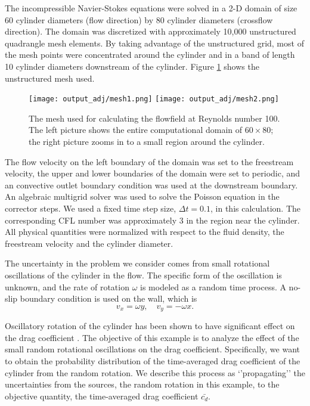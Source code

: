 The incompressible Navier-Stokes equations were solved in a
2-D domain of size 60 cylinder diameters (flow direction) by 80
cylinder diameters (crossflow direction).  The domain was discretized with
approximately 10,000 unstructured quadrangle mesh elements.
By taking advantage of
the unstructured grid, most of the mesh points were concentrated
around the cylinder
and in a band of length 10 cylinder diameters downstream of the cylinder.
Figure \ref{mesh1} shows the unstructured mesh used.
\begin{figure}[htb!] \center 
\texttt{[image: output\_adj/mesh1.png]}
\texttt{[image: output\_adj/mesh2.png]}
\caption{The mesh used for calculating the flowfield at Reynolds number 100.
The left picture shows the entire computational domain of $60 \times 80$;
the right picture zooms in to a small region around the cylinder.}
\label{mesh1}
\end{figure}
The flow velocity on the left
boundary of the domain was set to the freestream velocity, the upper and lower
boundaries of the domain were set to periodic, and an convective outlet
boundary condition
was used at the downstream boundary.  An algebraic multigrid solver was used
to solve the Poisson equation in the corrector steps.  We used a fixed time
step size, $\Delta t = 0.1$, in this calculation.  The corresponding CFL
number was approximately $3$ in the region near the cylinder.
All physical quantities were
normalized with respect to the fluid density, the freestream velocity and
the cylinder diameter.

The uncertainty in the problem we consider comes from small rotational
oscillations of the cylinder in the flow.
The specific form of the oscillation is
unknown, and the rate of rotation $\omega$ is modeled as a random time process.
A no-slip boundary condition is used on the wall, which is
\[ v_x = \omega y, \quad v_y = -\omega x. \]
 
Oscillatory rotation of the cylinder has been shown to
have significant effect on the drag coefficient \cite[]{rotary_control}.
The objective of this example is to analyze the effect of the small
random rotational oscillations on the drag coefficient.  Specifically,
we want to obtain the probability distribution of the time-averaged drag
coefficient of the cylinder from the random rotation.
We describe this process as `'propagating'' the uncertainties from
the sources, the random rotation in this example,
to the objective quantity, the time-averaged drag coefficient $\bar{c_d}$.

